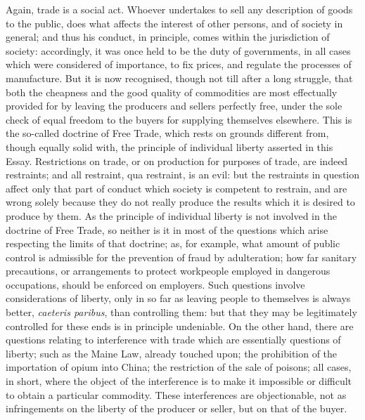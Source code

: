 \documentclass[11pt,openany]{book}
\begin{document}
Again, trade is a social act. Whoever undertakes to sell any description of goods to the public, does what affects the interest of other persons, and of society in general; and thus his conduct, in principle, comes within the jurisdiction of society: accordingly, it was once held to be the duty of governments, in all cases which were considered of importance, to fix prices, and regulate the processes of manufacture. But it is now recognised, though not till after a long struggle, that both the cheapness and the good quality of commodities are most effectually provided for by leaving the producers and sellers perfectly free, under the sole check of equal freedom to the buyers for supplying themselves elsewhere. This is the so-called doctrine of Free Trade, which rests on grounds different from, though equally solid with, the principle of individual liberty asserted in this Essay. Restrictions on trade, or on production for purposes of trade, are indeed restraints; and all restraint, qua restraint, is an evil: but the restraints in question affect only that part of conduct which society is competent to restrain, and are wrong solely because they do not really produce the results which it is desired to produce by them. As the principle of individual liberty is not involved in the doctrine of Free Trade, so neither is it in most of the questions which arise respecting the limits of that doctrine; as, for example, what amount of public control is admissible for the prevention of fraud by adulteration; how far sanitary precautions, or arrangements to protect workpeople employed in dangerous occupations, should be enforced on employers. Such questions involve considerations of liberty, only in so far as leaving people to themselves is always better, \emph{caeteris paribus}, than controlling them: but that they may be legitimately controlled for these ends is in principle undeniable. On the other hand, there are questions relating to interference with trade which are essentially questions of liberty; such as the Maine Law, already touched upon; the prohibition of the importation of opium into China; the restriction of the sale of poisons; all cases, in short, where the object of the interference is to make it impossible or difficult to obtain a particular commodity. These interferences are objectionable, not as infringements on the liberty of the producer or seller, but on that of the buyer.
\end{document}
